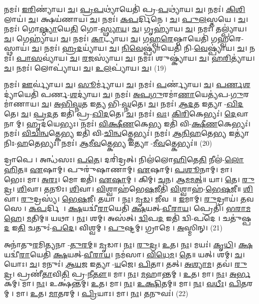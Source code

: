 𑌨𑌮𑌃॑। \ul{𑌇}\ul{𑌰𑌿}𑌣𑍍𑌯𑌾॑𑌯। \ul{𑌚}। \ul{𑌪𑍍𑌰}\ul{𑌪}𑌥𑍍𑌯𑌾॑𑌯𑍇𑌤𑌿॑ 𑌪𑍍𑌰-\ul{𑌪}𑌥𑍍𑌯𑌾॑𑌯। \ul{𑌚}। 
𑌨𑌮𑌃॑। \ul{𑌕𑌿}\ul{}\ul{𑌶𑌿}𑌲𑌾𑌯॑। \ul{𑌚}। 𑌕𑍍𑌷𑌯॑𑌣𑌾𑌯। \ul{𑌚}। 
𑌨𑌮𑌃॑। \ul{𑌕}\ul{𑌪}𑌰𑍍𑌦𑌿𑌨𑍇। \ul{𑌚}। \ul{𑌪𑍁}\ul{𑌲}𑌸𑍍𑌤𑌯𑍇। \ul{𑌚}। 
𑌨𑌮𑌃॑। 𑌗𑍋\ul{𑌷𑍍𑌠𑍍𑌯𑌾}𑌯𑍇\ul{𑌤𑌿} 𑌗𑍋-\ul{𑌸𑍍𑌥𑍍𑌯𑌾}\ul{𑌯}। \ul{𑌚}। 𑌗𑍃𑌹𑍍𑌯𑌾॑𑌯। \ul{𑌚}। 
𑌨𑌮𑌃॑। 𑌤𑌲𑍍𑌪𑍍𑌯𑌾॑𑌯। \ul{𑌚}। 𑌗𑍇𑌹𑍍𑌯𑌾॑𑌯। \ul{𑌚}। 
𑌨𑌮𑌃॑। \ul{𑌕𑌾}𑌟𑍍𑌯𑌾॑𑌯। \ul{𑌚}। \ul{𑌗}\ul{𑌹𑍍𑌵}\ul{𑌰𑍇}𑌷𑍍𑌠𑌾𑌯𑍇𑌤𑌿॑ 𑌗𑌹𑍍𑌵𑌰𑍇-𑌸𑍍𑌥𑌾𑌯॑। \ul{𑌚}। 
𑌨𑌮𑌃॑। \ul{𑌹𑍍𑌰}\ul{𑌦}𑌯𑍍𑌯𑌾॑𑌯। \ul{𑌚}। \ul{𑌨𑌿}\ul{𑌵𑍇}𑌷𑍍𑌪𑍍𑌯𑌾॑𑌯𑍇𑌤𑌿॑ 𑌨𑌿-\ul{𑌵𑍇}𑌷𑍍𑌪𑍍𑌯𑌾॑𑌯। \ul{𑌚}। 
𑌨𑌮𑌃॑। \ul{𑌪𑌾}\ul{}\ul{𑌸}𑌵𑍍𑌯𑌾॑𑌯। \ul{𑌚}। \ul{𑌰}\ul{𑌜}𑌸𑍍𑌯𑌾॑𑌯। \ul{𑌚}। 
𑌨𑌮𑌃॑। 𑌶𑍁𑌷𑍍𑌕𑍍𑌯𑌾॑𑌯। \ul{𑌚}। \ul{𑌹}\ul{𑌰𑌿}𑌤𑍍𑌯𑌾॑𑌯। \ul{𑌚}। 
𑌨𑌮𑌃॑। 𑌲𑍋𑌪𑍍𑌯𑌾॑𑌯। \ul{𑌚}। \ul{𑌉}\ul{𑌲}𑌪𑍍𑌯𑌾॑𑌯। \ul{𑌚}। (19)


𑌨𑌮𑌃॑। \ul{𑌊}𑌰𑍍𑌵𑍍𑌯𑌾॑𑌯। \ul{𑌚}। \ul{𑌸𑍂}𑌰𑍍𑌮𑍍𑌯𑌾॑𑌯। \ul{𑌚}। 
𑌨𑌮𑌃॑। \ul{𑌪}𑌰𑍍𑌣𑍍𑌯𑌾॑𑌯। \ul{𑌚}। \ul{𑌪}\ul{𑌰𑍍𑌣}\ul{𑌶}𑌦𑍍𑌯𑌾॑𑌯𑍇𑌤𑌿॑ 𑌪𑌰𑍍𑌣-\ul{𑌶}𑌦𑍍𑌯𑌾॑𑌯। \ul{𑌚}। 
𑌨𑌮𑌃॑। \ul{𑌅}\ul{𑌪}\ul{𑌗𑍁}𑌰𑌮𑌾॑\ul{𑌣𑌾}𑌯𑍇𑌤𑍍𑌯॑𑌪-\ul{𑌗𑍁}𑌰𑌮𑌾॑𑌣𑌾𑌯। \ul{𑌚}। \ul{𑌅}\ul{𑌭𑌿}\ul{𑌘𑍍𑌨}𑌤 𑌇𑌤𑍍𑌯𑌭𑌿-\ul{𑌘𑍍𑌨}𑌤𑍇। \ul{𑌚}। 
𑌨𑌮𑌃॑। \mbox{\ul{𑌆}\akhkhi{}\ul{𑌦}𑌤} 𑌇𑌤𑍍𑌯𑌾-\ul{𑌖𑌿}\ul{𑌦}𑌤𑍇। \ul{𑌚}। \mbox{\ul{𑌪𑍍𑌰}\akhkhi{}\ul{𑌦}𑌤} 𑌇𑌤𑌿॑ 𑌪𑍍𑌰-\ul{𑌖𑌿}\ul{𑌦}𑌤𑍇। \ul{𑌚}। 
𑌨𑌮𑌃॑। \ul{𑌵𑌃}। \ul{𑌕𑌿}\ul{𑌰𑌿}𑌕𑍇𑌭𑍍𑌯𑌃॑। \ul{𑌦𑍇}𑌵𑌾𑌨𑌾𑌮𑍍। 𑌹𑍃𑌦॑𑌯𑍇𑌭𑍍𑌯𑌃। 𑌨𑌮𑌃॑। 
\ul{𑌵𑌿}\ul{𑌕𑍍𑌷𑍀}\ul{𑌣}𑌕𑍇\ul{𑌭𑍍𑌯} 𑌇𑌤𑌿॑ 𑌵𑌿-\ul{𑌕𑍍𑌷𑍀}\ul{𑌣}𑌕𑍇𑌭𑍍𑌯𑌃॑। 𑌨𑌮𑌃॑। \ul{𑌵𑌿}\ul{𑌚𑌿}\ul{𑌨𑍍𑌵}𑌤𑍍𑌕𑍇\ul{𑌭𑍍𑌯} 𑌇𑌤𑌿॑ 𑌵𑌿-\ul{𑌚𑌿}\ul{𑌨𑍍𑌵}𑌤𑍍𑌕𑍇𑌭𑍍𑌯𑌃॑। 𑌨𑌮𑌃॑। 
\ul{𑌆}\ul{𑌨𑌿}\ar{}\ul{𑌹}𑌤𑍇\ul{𑌭𑍍𑌯} 𑌇𑌤𑍍𑌯𑌾॑𑌨𑌿𑌃-\ul{𑌹}𑌤𑍇𑌭𑍍𑌯𑌃॑। 𑌨𑌮𑌃॑। \ul{𑌆}\ul{𑌮𑍀}\ul{𑌵}𑌤𑍍𑌕𑍇\ul{𑌭𑍍𑌯} 𑌇𑌤𑍍𑌯𑌾-\ul{𑌮𑍀}\ul{𑌵}𑌤𑍍𑌕𑍇𑌭𑍍𑌯𑌃॑॥ (20)


𑌦𑍍𑌰𑌾𑌪𑍇। 𑌅𑌨𑍍𑌧॑𑌸𑌃। \ul{𑌪}\ul{𑌤𑍇}। 𑌦𑌰𑌿॑𑌦𑍍𑌰𑌤𑍍। 𑌨𑌿𑌲॑𑌲𑍋\ul{𑌹𑌿}𑌤𑍇\ul{𑌤𑌿} 𑌨𑍀𑌲॑-\ul{𑌲𑍋}\ul{𑌹𑌿}\ul{𑌤}॥ 
\ul{𑌏}𑌷𑌾𑌮𑍍। 𑌪𑍁𑌰𑍁॑𑌷𑌾𑌣𑌾𑌮𑍍। \ul{𑌏}𑌷𑌾𑌮𑍍। \ul{𑌪}\ul{𑌶𑍂}𑌨𑌾𑌮𑍍। 𑌮𑌾। 𑌭𑍇𑌃। 𑌮𑌾। \ul{𑌅}\ul{𑌰𑌃}। 𑌮𑍋 𑌇𑌤𑌿॑। \ul{𑌏}\ul{𑌷𑌾}𑌮𑍍। 𑌕𑌿𑌮𑍍। \ul{𑌚}𑌨। \ul{𑌆}\ul{𑌮}\ul{𑌮}\ul{𑌤𑍍}॥ 
𑌯𑌾। \ul{𑌤𑍇}। \ul{𑌰𑍁}\ul{𑌦𑍍𑌰}। \ul{𑌶𑌿}𑌵𑌾। \ul{𑌤}𑌨𑍂𑌃। \ul{𑌶𑌿}𑌵𑌾। \ul{𑌵𑌿}𑌶𑍍𑌵𑌾𑌹॑𑌭𑍇\ul{𑌷}𑌜𑍀𑌤𑌿॑ \ul{𑌵𑌿}𑌶𑍍𑌵𑌾𑌹॑-\ul{𑌭𑍇}\ul{𑌷}\ul{𑌜𑍀}॥ 
\ul{𑌶𑌿}𑌵𑌾। \ul{𑌰𑍁}𑌦𑍍𑌰𑌸𑍍𑌯॑। \ul{𑌭𑍇}\ul{𑌷}𑌜𑍀। 𑌤𑌯𑌾। \ul{𑌨𑌃}। \ul{𑌮𑍃}\ul{𑌡}। \ul{𑌜𑍀}𑌵𑌸𑍇᳚॥ 
\ul{𑌇}𑌮𑌾𑌮𑍍। \ul{𑌰𑍁}𑌦𑍍𑌰𑌾𑌯॑। \ul{𑌤}𑌵𑌸𑍇। \ul{𑌕}\ul{𑌪}𑌰𑍍𑌦𑌿𑌨𑍇᳚। \ul{𑌕𑍍𑌷}𑌯𑌦𑍍𑌵𑍀॑\ul{𑌰𑌾}𑌯𑍇𑌤𑌿॑ \ul{𑌕𑍍𑌷}𑌯𑌤𑍍-\ul{𑌵𑍀}\ul{𑌰𑌾}\ul{𑌯}। 𑌪𑍍𑌰𑍇𑌤𑌿॑। \ul{𑌭}\ul{𑌰𑌾}\ul{𑌮}\ul{𑌹𑍇}। \ul{𑌮}𑌤𑌿𑌮𑍍॥ 
𑌯𑌥𑌾। \ul{𑌨𑌃}। 𑌶𑌮𑍍। 𑌅𑌸॑𑌤𑍍। \ul{𑌦𑍍𑌵𑌿}𑌪\ul{𑌦} 𑌇𑌤𑌿॑ 𑌦𑍍𑌵𑌿-𑌪𑌦𑍇। 𑌚𑌤𑍁॑𑌷𑍍𑌪\ul{𑌦} 𑌇\ul{𑌤𑌿} 𑌚𑌤𑍁𑌃॑-\ul{𑌪}\ul{𑌦𑍇}। 𑌵𑌿𑌶𑍍𑌵𑌮𑍍। \ul{𑌪𑍁}𑌷𑍍𑌟𑌮𑍍। 𑌗𑍍𑌰𑌾𑌮𑍇। \ul{𑌅}𑌸𑍍𑌮𑌿𑌨𑍍। (21)


𑌅𑌨𑌾॑𑌤𑍁\ul{𑌰}𑌮𑌿𑌤𑍍𑌯𑌨𑌾-\ul{𑌤𑍁}\ul{𑌰}\ul{𑌮𑍍}॥ 
\ul{𑌮𑍃}𑌡𑌾। \ul{𑌨𑌃}। \ul{𑌰𑍁}\ul{𑌦𑍍𑌰}। \ul{𑌉}𑌤। \ul{𑌨𑌃}। 𑌮𑌯𑌃॑। \ul{𑌕𑍃}\ul{𑌧𑌿}। \ul{𑌕𑍍𑌷}𑌯𑌦𑍍𑌵𑍀॑\ul{𑌰𑌾}𑌯𑍇𑌤𑌿॑ \ul{𑌕𑍍𑌷}𑌯𑌤𑍍-\ul{𑌵𑍀}\ul{𑌰𑌾}\ul{𑌯}। 𑌨𑌮॑𑌸𑌾। \ul{𑌵𑌿}\ul{𑌧𑍇}\ul{𑌮}। \ul{𑌤𑍇}॥ 
𑌯𑌤𑍍। 𑌶𑌮𑍍। \ul{𑌚}। 𑌯𑍋𑌃। \ul{𑌚}। 𑌮𑌨𑍁𑌃॑। \ul{𑌆}\ul{𑌯}𑌜 𑌇𑌤𑍍𑌯𑌾-\ul{𑌯}𑌜𑍇। \ul{𑌪𑌿}𑌤𑌾। 𑌤𑌤𑍍। \ul{𑌅}\ul{𑌶𑍍𑌯𑌾}\ul{𑌮}। 𑌤𑌵॑। \ul{𑌰𑍁}\ul{𑌦𑍍𑌰}। 𑌪𑍍𑌰𑌣𑍀॑\ul{𑌤𑌾}𑌵𑌿\ul{𑌤𑌿} 𑌪𑍍𑌰-\ul{𑌨𑍀}\ul{𑌤𑍗}॥ 
𑌮𑌾। \ul{𑌨𑌃}। \ul{𑌮}𑌹𑌾𑌨𑍍𑌤𑌮𑍍। \ul{𑌉}𑌤। 𑌮𑌾। \ul{𑌨𑌃}। \ul{𑌅}\ul{𑌰𑍍𑌭}𑌕𑌮𑍍। 𑌮𑌾। \ul{𑌨𑌃}। 𑌉𑌕𑍍𑌷॑𑌨𑍍𑌤𑌮𑍍। \ul{𑌉}𑌤। 𑌮𑌾। \ul{𑌨𑌃}। \ul{𑌉}\ul{𑌕𑍍𑌷𑌿}𑌤𑌮𑍍॥ 
𑌮𑌾। \ul{𑌨𑌃}। \ul{𑌵}\ul{𑌧𑍀𑌃}। \ul{𑌪𑌿}𑌤𑌰𑌮𑍍। 𑌮𑌾। \ul{𑌉}𑌤। \ul{𑌮𑌾}𑌤𑌰𑌮𑍍। \ul{𑌪𑍍𑌰𑌿}𑌯𑌾𑌃। 𑌮𑌾। \ul{𑌨𑌃}। \ul{𑌤}𑌨𑍁𑌵𑌃॑। (22)


